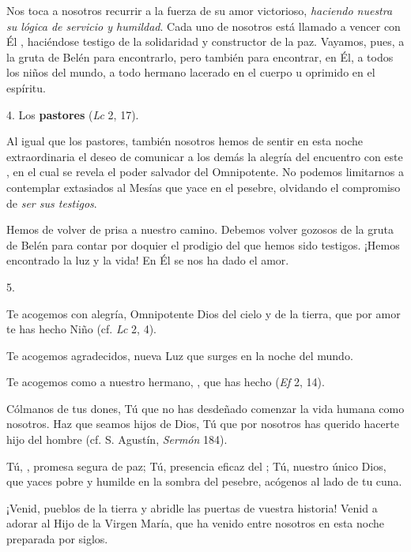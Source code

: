 Nos toca a nosotros recurrir a la fuerza de su amor victorioso, \emph{haciendo nuestra su lógica de servicio y humildad}. Cada uno de nosotros está llamado a vencer con Él , haciéndose testigo de la solidaridad y constructor de la paz. Vayamos, pues, a la gruta de Belén para encontrarlo, pero también para encontrar, en Él, a todos los niños del mundo, a todo hermano lacerado en el cuerpo u oprimido en el espíritu.

4. Los \textbf{pastores} \emph{} (\emph{Lc} 2, 17).

Al igual que los pastores, también nosotros hemos de sentir en esta noche extraordinaria el deseo de comunicar a los demás la alegría del encuentro con este \emph{}, en el cual se revela el poder salvador del Omnipotente. No podemos limitarnos a contemplar extasiados al Mesías que yace en el pesebre, olvidando el compromiso de \emph{ser sus testigos}.

Hemos de volver de prisa a nuestro camino. Debemos volver gozosos de la gruta de Belén para contar por doquier el prodigio del que hemos sido testigos. ¡Hemos encontrado la luz y la vida! En Él se nos ha dado el amor.

5. \emph{}

Te acogemos con alegría, Omnipotente Dios del cielo y de la tierra, que por amor te has hecho Niño \emph{} (cf. \emph{Lc} 2, 4).

Te acogemos agradecidos, nueva Luz que surges en la noche del mundo.

Te acogemos como a nuestro hermano, , que has hecho  (\emph{Ef} 2, 14).

Cólmanos de tus dones, Tú que no has desdeñado comenzar la vida humana como nosotros. Haz que seamos hijos de Dios, Tú que por nosotros has querido hacerte hijo del hombre (cf. S. Agustín, \emph{Sermón} 184).

Tú, , promesa segura de paz; Tú, presencia eficaz del ; Tú, nuestro único Dios, que yaces pobre y humilde en la sombra del pesebre, acógenos al lado de tu cuna.

¡Venid, pueblos de la tierra y abridle las puertas de vuestra historia! Venid a adorar al Hijo de la Virgen María, que ha venido entre nosotros en esta noche preparada por siglos.

